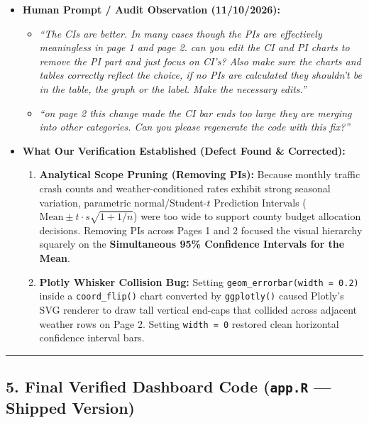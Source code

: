 \documentclass[
  letterpaper,
  DIV=11,
  numbers=noendperiod]{scrartcl}
\providecommand{\tightlist}{%
  \setlength{\itemsep}{0pt}\setlength{\parskip}{0pt}}
\begin{document}
\begin{itemize}
\tightlist
\item
  \textbf{Human Prompt / Audit Observation (11/10/2026):}

  \begin{itemize}
  \tightlist
  \item
    \emph{``The CIs are better. In many cases though the PIs are
    effectively meaningless in page 1 and page 2. can you edit the CI
    and PI charts to remove the PI part and just focus on CI's? Also
    make sure the charts and tables correctly reflect the choice, if no
    PIs are calculated they shouldn't be in the table, the graph or the
    label. Make the necessary edits.''}
  \item
    \emph{``on page 2 this change made the CI bar ends too large they
    are merging into other categories. Can you please regenerate the
    code with this fix?''}
  \end{itemize}
\item
  \textbf{What Our Verification Established (Defect Found \&
  Corrected):}

  \begin{enumerate}
  \def\labelenumi{\arabic{enumi}.}
  \tightlist
  \item
    \textbf{Analytical Scope Pruning (Removing PIs):} Because monthly
    traffic crash counts and weather-conditioned rates exhibit strong
    seasonal variation, parametric normal/Student-\(t\) Prediction
    Intervals (\(\text{Mean} \pm t \cdot s\sqrt{1 + 1/n}\)) were too
    wide to support county budget allocation decisions. Removing PIs
    across Pages 1 and 2 focused the visual hierarchy squarely on the
    \textbf{Simultaneous 95\% Confidence Intervals for the Mean}.
  \item
    \textbf{Plotly Whisker Collision Bug:} Setting
    \texttt{geom\_errorbar(width\ =\ 0.2)} inside a
    \texttt{coord\_flip()} chart converted by \texttt{ggplotly()} caused
    Plotly's SVG renderer to draw tall vertical end-caps that collided
    across adjacent weather rows on Page 2. Setting \texttt{width\ =\ 0}
    restored clean horizontal confidence interval bars.
  \end{enumerate}
\end{itemize}

\begin{center}\rule{0.5\linewidth}{0.5pt}\end{center}

\subsection{\texorpdfstring{5. Final Verified Dashboard Code
(\texttt{app.R} --- Shipped
Version)}{5. Final Verified Dashboard Code (app.R --- Shipped Version)}}\label{final-verified-dashboard-code-app.r-shipped-version}
\end{document}
